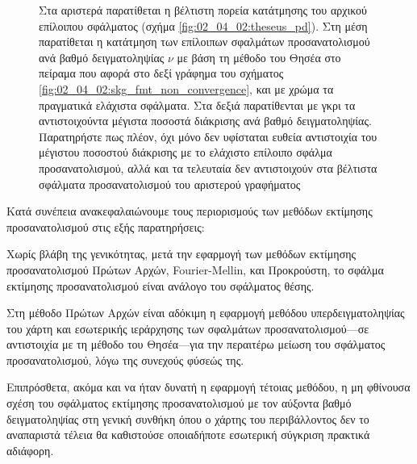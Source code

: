 \begin{figure}[!h]
\begin{subfigure}{0.33\linewidth}
\begin{onion}{0.7cm}
    \end{onion}
  \end{subfigure}
\vspace{-1cm}
\caption{\small Στα αριστερά παρατίθεται η βέλτιστη πορεία κατάτμησης του
         αρχικού επίλοιπου σφάλματος (σχήμα \ref{fig:02_04_02:theseus_pd}). Στη
         μέση παρατίθεται η κατάτμηση των επίλοιπων σφαλμάτων προσανατολισμού
         ανά βαθμό δειγματοληψίας $\nu$ με βάση τη μέθοδο του Θησέα στο πείραμα
         που αφορά στο δεξί γράφημα του σχήματος
         \ref{fig:02_04_02:skg_fmt_non_convergence}, και με χρώμα τα πραγματικά
         ελάχιστα σφάλματα. Στα δεξιά παρατίθενται με γκρι τα αντιστοιχούντα
         μέγιστα ποσοστά διάκρισης ανά βαθμό δειγματοληψίας. Παρατηρήστε πως
         πλέον, όχι μόνο δεν υφίσταται ευθεία αντιστοιχία του μέγιστου ποσοστού
         διάκρισης με το ελάχιστο επίλοιπο σφάλμα προσανατολισμού, αλλά και τα
         τελευταία δεν αντιστοιχούν στα βέλτιστα σφάλματα προσανατολισμού του
         αριστερού γραφήματος}
\label{fig:02_04_02:theseus_false_pd}
\end{figure}

Κατά συνέπεια ανακεφαλαιώνουμε τους περιορισμούς των μεθόδων εκτίμησης
προσανατολισμού στις εξής παρατηρήσεις:

\begin{remark}
  \label{remark:02_04_02:01}
  Χωρίς βλάβη της γενικότητας, μετά την εφαρμογή των μεθόδων εκτίμησης
  προσανατολισμού Πρώτων Αρχών, Fourier-Mellin, και Προκρούστη, το σφάλμα
  εκτίμησης προσανατολισμού είναι ανάλογο του σφάλματος θέσης.
\end{remark}

\begin{remark}
  \label{remark:02_04_02:02}
  Στη μέθοδο Πρώτων Αρχών είναι αδόκιμη η εφαρμογή μεθόδου υπερδειγματοληψίας
  του χάρτη και εσωτερικής ιεράρχησης των σφαλμάτων προσανατολισμού---σε
  αντιστοιχία με τη μέθοδο του Θησέα---για την περαιτέρω μείωση του σφάλματος
  προσανατολισμού, λόγω της συνεχούς φύσεώς της.
\end{remark}

\begin{remark}
  \label{remark:02_04_02:03}
  Επιπρόσθετα, ακόμα και να ήταν δυνατή η εφαρμογή τέτοιας μεθόδου, η μη
  φθίνουσα σχέση του σφάλματος εκτίμησης προσανατολισμού με τον αύξοντα βαθμό
  δειγματοληψίας στη γενική συνθήκη όπου ο χάρτης του περιβάλλοντος δεν το
  αναπαριστά τέλεια θα καθιστούσε οποιαδήποτε εσωτερική σύγκριση πρακτικά
  αδιάφορη.
\end{remark}

